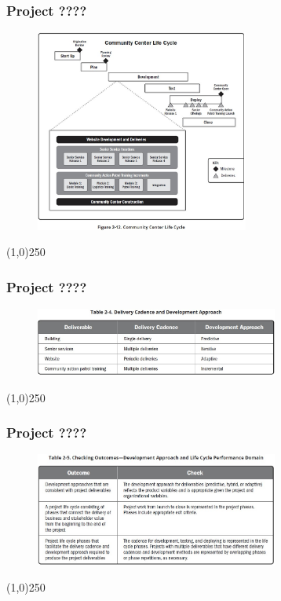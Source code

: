 \begin{frame}
\frametitle{Project ????}
 \begin{figure}
    \centering
        \includegraphics[width = 7cm]{../images/guide/Fig2-12.jpg}
    \label{guidefig:2-12}
 \end{figure}
\end{frame}
\begin{center}\line(1,0){250}\end{center}

\begin{frame}
\frametitle{Project ????}
 \begin{figure}
    \centering
        \includegraphics[width = 8cm]{../images/guide/Table2-4.jpg}
    \label{guideTable:2-4}
 \end{figure}
\end{frame}
\begin{center}\line(1,0){250}\end{center}

\begin{frame}
\frametitle{Project ????}
 \begin{figure}
    \centering
        \includegraphics[width = 8cm]{../images/guide/Table2-5.jpg}
    \label{guideTable:2-5}
 \end{figure}
\end{frame}
\begin{center}\line(1,0){250}\end{center}




